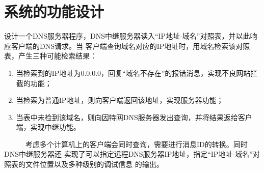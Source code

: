 \documentclass{ctexart}
\begin{document}
\begin{titlepage}
    \begin{center}
    \phantom{Start!}
	\vspace{3cm}
        {
        \setlength{\baselineskip}{40pt}
        \vspace{1cm}
        \vspace{3.5cm}
        \vspace{5cm}
        }
    \end{center}
\end{titlepage}

\pagebreak[4]

\tableofcontents

\pagebreak[4]

\section{系统的功能设计}
\label{sec:purpose}
设计一个DNS服务器程序，DNS中继服务器读入“IP地址-域名”对照表，并以此响应客户端的DNS请求。当
客户端查询域名对应的IP地址时，用域名检索该对照表，产生三种可能检索结果：
\begin{enumerate}
    \item 当检索到的IP地址为0.0.0.0，回复“域名不存在”的报错消息，实现不良网站拦截的功能；
    \item 当检索为普通IP地址，则向客户端返回该地址，实现服务器功能；
    \item 当表中未检到该域名，则向因特网DNS服务器发出查询，并将结果返给客户端，实现中继功能。
\end{enumerate}
\ \ \ \ \ \ 考虑多个计算机上的客户端会同时查询，需要进行消息ID的转换。同时DNS中继服务器还
实现了可以指定远程DNS服务器IP地址，指定“IP地址-域名”对照表的文件位置以及多种级别的调试信息
的输出。
\end{document}
